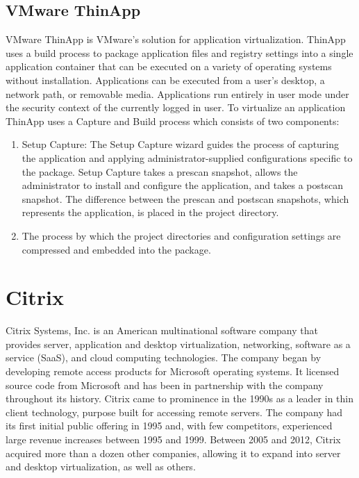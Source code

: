 \subsection{VMware ThinApp}
VMware ThinApp is VMware's solution for application virtualization. ThinApp uses a build process to package application files and registry settings into a single application container that can be executed on a variety of operating systems without installation. Applications can be executed from a user's desktop, a network path, or removable media. Applications run entirely in user mode under the security context of the currently logged in user. To virtualize an application ThinApp uses a Capture and Build process which consists of two components:
\begin{enumerate}
\item Setup Capture: The Setup Capture wizard guides the process of capturing the application and applying administrator-supplied configurations specific to the package. Setup Capture takes a prescan snapshot, allows the administrator to install and configure the application, and takes a postscan snapshot. The difference between the prescan and postscan snapshots, which represents the application, is placed in the project directory.
\item The process by which the project directories and configuration settings are compressed and embedded into the package.
\end{enumerate}

\section{Citrix}
Citrix Systems, Inc. is an American multinational software company that provides server, application and desktop virtualization, networking, software as a service (SaaS), and cloud computing technologies. The company began by developing remote access products for Microsoft operating systems. It licensed source code from Microsoft and has been in partnership with the company throughout its history. Citrix came to prominence in the 1990s as a leader in thin client technology, purpose built for accessing remote servers. The company had its first initial public offering in 1995 and, with few competitors, experienced large revenue increases between 1995 and 1999. Between 2005 and 2012, Citrix acquired more than a dozen other companies, allowing it to expand into server and desktop virtualization, as well as others.

